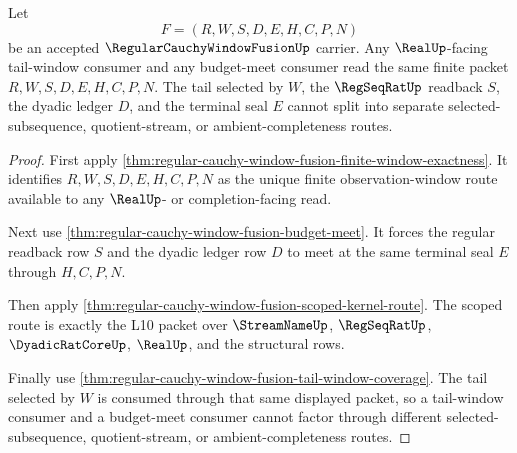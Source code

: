 \begin{theorem}
\label{thm:regular-cauchy-window-fusion-tail-budget-meet}
Let
$$
F=(R,W,S,D,E,H,C,P,N)
$$
be an accepted $\RegularCauchyWindowFusionUp$ carrier. Any $\RealUp$-facing tail-window consumer and any budget-meet consumer read the same finite packet $R,W,S,D,E,H,C,P,N$. The tail selected by $W$, the $\RegSeqRatUp$ readback $S$, the dyadic ledger $D$, and the terminal seal $E$ cannot split into separate selected-subsequence, quotient-stream, or ambient-completeness routes.
\end{theorem}
\begin{proof}
First apply \autoref{thm:regular-cauchy-window-fusion-finite-window-exactness}. It identifies $R,W,S,D,E,H,C,P,N$ as the unique finite observation-window route available to any $\RealUp$- or completion-facing read.

Next use \autoref{thm:regular-cauchy-window-fusion-budget-meet}. It forces the regular readback row $S$ and the dyadic ledger row $D$ to meet at the same terminal seal $E$ through $H,C,P,N$.

Then apply \autoref{thm:regular-cauchy-window-fusion-scoped-kernel-route}. The scoped route is exactly the L10 packet over $\StreamNameUp$, $\RegSeqRatUp$, $\DyadicRatCoreUp$, $\RealUp$, and the structural rows.

Finally use \autoref{thm:regular-cauchy-window-fusion-tail-window-coverage}. The tail selected by $W$ is consumed through that same displayed packet, so a tail-window consumer and a budget-meet consumer cannot factor through different selected-subsequence, quotient-stream, or ambient-completeness routes.
\end{proof}

